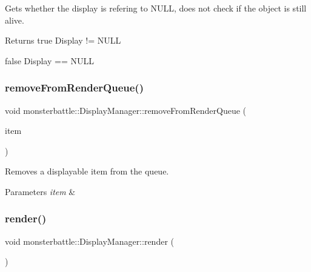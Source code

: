 Gets whether the display is refering to N\+U\+LL, does not check if the object is still alive. 

\begin{DoxyReturn}{Returns}
true Display != N\+U\+LL 

false Display == N\+U\+LL 
\end{DoxyReturn}
\mbox{\label{classmonsterbattle_1_1DisplayManager_a2a616e9af9dfbd40a326b4348e62d807}} 
\subsubsection{\texorpdfstring{remove\+From\+Render\+Queue()}{removeFromRenderQueue()}}
{\footnotesize\ttfamily void monsterbattle\+::\+Display\+Manager\+::remove\+From\+Render\+Queue (\begin{DoxyParamCaption}\item[{const \hyperlink{structmonsterbattle_1_1IDisplayable}{I\+Displayable} $\ast$}]{item }\end{DoxyParamCaption})}



Removes a displayable item from the queue. 


\begin{DoxyParams}{Parameters}
{\em item} & \\
\hline
\end{DoxyParams}
\mbox{\label{classmonsterbattle_1_1DisplayManager_af524ed6d4731be99258323f2b2735183}} 
\subsubsection{\texorpdfstring{render()}{render()}}
{\footnotesize\ttfamily void monsterbattle\+::\+Display\+Manager\+::render (\begin{DoxyParamCaption}{ }\end{DoxyParamCaption})}



